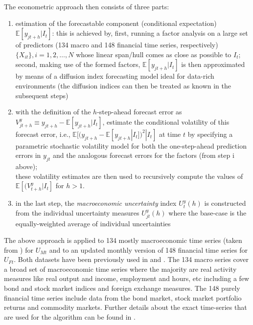 \documentclass[a4paper,11pt,listof=nochaptergap,oneside,pointednumbers,bibtotoc,bigheadings,liststotoc,hidelinks]{scrbook}
\theoremstyle{mysatz}
\theoremstyle{mydefinition}
\theoremstyle{mytheorem}
\theoremstyle{mybemerkung}
\begin{document}
The econometric approach then consists of three parts:
\begin{enumerate}[i]
	\item estimation of the forecastable component (conditional expectation) $\mathbb{E}[y_{jt+h}|I_t]$: this is achieved by, first, running a factor analysis on a large set of predictors (134 macro and 148 financial time series, respectively) $\{X_{it}\}, i = 1, 2, \dots, N$ whose linear span/hull comes as close as possible to $I_t$; second, making use of the formed factors, $\mathbb{E}[y_{jt+h}|I_t]$ is then approximated by means of a diffusion index forecasting model ideal for data-rich environments (the diffusion indices can then be treated as known in the subsequent steps)
	\item with the definition of the $h$-step-ahead forecast error as $V_{jt+h}^y \equiv y_{jt+h} - \mathbb{E}[y_{jt+h}|I_t]$, \citet{juradoetal:15} estimate the conditional volatility of this forecast error, i.e., $\mathbb{E}[(y_{jt+h} - \mathbb{E}[y_{jt+h}|I_t])^2|I_t]$ at time $t$ by specifying a parametric stochastic volatility model for both the one-step-ahead prediction errors in $y_{jt}$ and the analogous forecast errors for the factors (from step i above); \\
	these volatility estimates are then used to recursively compute the values of $\mathbb{E}[(V_{t+h}^y|I_t]$ for $h > 1$. 
	\item in the last step, the \textit{macroeconomic uncertainty} index $U_t^y(h)$ is constructed from the individual uncertainty measures $U_{jt}^y(h)$ where the base-case is the equally-weighted average of individual uncertainties
\end{enumerate}

The above approach is applied to 134 mostly macroeconomic time series (taken from \citet{mccrackenandng:16}) for $U_{Mt}$ and to an updated monthly version of 148 financial time series for $U_{Ft}$. Both datasets have been previously used in \citet{ludvigsonandng:07} and \citet{juradoetal:15}. The 134 macro series cover a broad set of macroeconomic time series where the majority are real activity measures like real output and income, employment and hours, etc including a few bond and stock market indices and foreign exchange measures. The 148 purely financial time series  include data from the bond market, stock market portfolio returns and commodity markets. Further details about the exact time-series that are used for the algorithm can be found in \citet{ludvigsonetal:18}.
\end{document}
